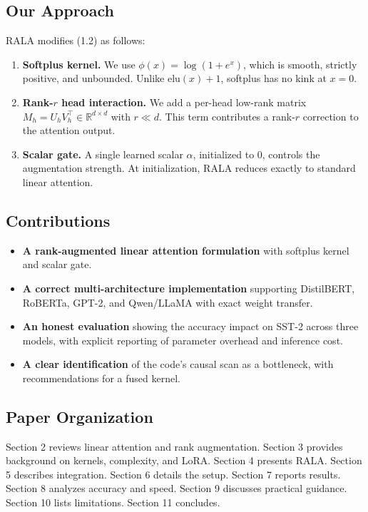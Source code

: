 \subsection{Our Approach}

RALA modifies (1.2) as follows:

\begin{enumerate}
\item \textbf{Softplus kernel.} We use $\phi(x) = \log(1 + e^x)$, which is smooth,
  strictly positive, and unbounded. Unlike $\mathrm{elu}(x) + 1$, softplus
  has no kink at $x = 0$.

\item \textbf{Rank-$r$ head interaction.} We add a per-head low-rank matrix
  $M_h = U_h V_h^\top \in \mathbb{R}^{d \times d}$ with $r \ll d$. This
  term contributes a rank-$r$ correction to the attention output.

\item \textbf{Scalar gate.} A single learned scalar $\alpha$, initialized to $0$,
  controls the augmentation strength. At initialization, RALA reduces
  exactly to standard linear attention.

\end{enumerate}
\subsection{Contributions}

\begin{itemize}
\item \textbf{A rank-augmented linear attention formulation} with softplus kernel
  and scalar gate.
\item \textbf{A correct multi-architecture implementation} supporting DistilBERT,
  RoBERTa, GPT-2, and Qwen/LLaMA with exact weight transfer.
\item \textbf{An honest evaluation} showing the accuracy impact on SST-2 across three
  models, with explicit reporting of parameter overhead and inference cost.
\item \textbf{A clear identification} of the code's causal scan as a bottleneck,
  with recommendations for a fused kernel.

\end{itemize}
\subsection{Paper Organization}

Section 2 reviews linear attention and rank augmentation. Section 3 provides 
background on kernels, complexity, and LoRA. Section 4 presents RALA. Section 
5 describes integration. Section 6 details the setup. Section 7 reports 
results. Section 8 analyzes accuracy and speed. Section 9 discusses 
practical guidance. Section 10 lists limitations. Section 11 concludes.



